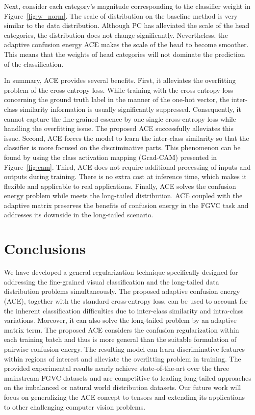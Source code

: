 \documentclass{article}
\begin{document}
Next, consider each category's magnitude corresponding to the classifier weight  in Figure~\ref{fig:w_norm}. The scale of   distribution on the baseline method is very similar to the data distribution. Although PC has alleviated the scale of the head categories, the distribution does not change significantly.  Nevertheless, the adaptive confusion energy ACE makes the scale of the head to become smoother. This means that the weights of head categories will not dominate the prediction of the classification. 

In summary, ACE provides several benefits. First, it alleviates the overfitting problem of the cross-entropy loss. While training with the cross-entropy loss concerning the ground truth label in the manner of the one-hot vector, the inter-class similarity information is usually significantly suppressed. Consequently, it cannot capture the fine-grained essence by one single cross-entropy loss while handling the overfitting issue. The proposed ACE successfully alleviates this issue. Second, ACE forces the model to learn the inter-class similarity so that the classifier is more focused on the discriminative parts. This phenomenon can be found by using the class activation mapping (Grad-CAM) \cite{selvaraju2017grad} presented in Figure~\ref{fig:cam}. Third, ACE does not require additional processing of inputs and outputs during training. There is no extra cost at inference time, which makes it flexible and applicable to real applications. Finally, ACE solves the confusion energy problem while meets the long-tailed distribution. ACE coupled with the adaptive matrix  preserves the benefits of confusion energy in the FGVC task and addresses its downside in the long-tailed scenario.

\section{Conclusions}


We have developed a general regularization technique specifically designed for addressing the fine-grained visual classification and the long-tailed data distribution problems simultaneously. The proposed adaptive confusion energy (ACE), together with the standard cross-entropy loss, can be used to account for the inherent classification difficulties due to inter-class similarity and intra-class variations. Moreover, it can also solve the long-tailed problem by an adaptive matrix term. The proposed ACE considers the confusion regularization within each training batch and thus is more general than the suitable formulation of pairwise confusion energy. The resulting model can learn discriminative features within regions of interest and alleviate the overfitting problem in training. The provided experimental results nearly achieve state-of-the-art over the three mainstream FGVC datasets and are competitive to leading long-tailed approaches on the imbalanced or natural world distribution datasets. Our future work will focus on generalizing the ACE concept to tensors and extending its applications to other challenging computer vision problems.




\end{document}
